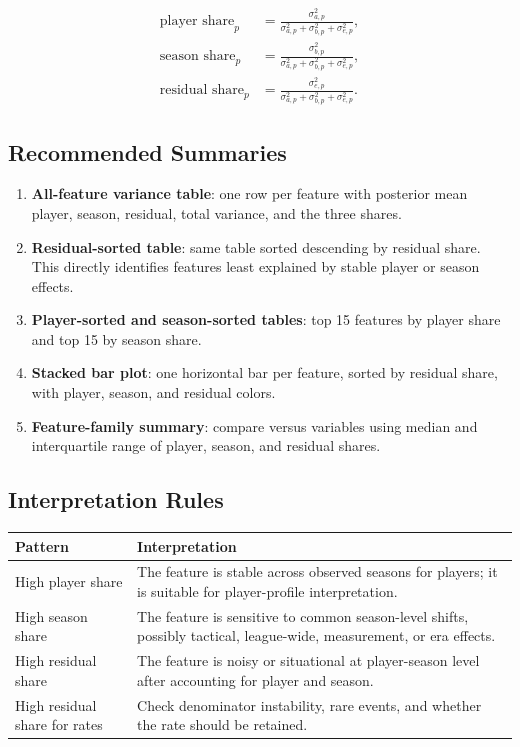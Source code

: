 \documentclass[11pt]{article}
\newcommand{\code}[1]{\texttt{\detokenize{#1}}}
\begin{document}
\begin{align*}
\text{player share}_p &=
\frac{\sigma^2_{a,p}}{\sigma^2_{a,p} + \sigma^2_{b,p} + \sigma^2_{e,p}}, \\
\text{season share}_p &=
\frac{\sigma^2_{b,p}}{\sigma^2_{a,p} + \sigma^2_{b,p} + \sigma^2_{e,p}}, \\
\text{residual share}_p &=
\frac{\sigma^2_{e,p}}{\sigma^2_{a,p} + \sigma^2_{b,p} + \sigma^2_{e,p}}.
\end{align*}

\subsection{Recommended Summaries}

\begin{enumerate}[leftmargin=*]
  \item \textbf{All-feature variance table}: one row per feature with posterior
  mean player, season, residual, total variance, and the three shares.
  \item \textbf{Residual-sorted table}: same table sorted descending by residual
  share. This directly identifies features least explained by stable player or
  season effects.
  \item \textbf{Player-sorted and season-sorted tables}: top 15 features by
  player share and top 15 by season share.
  \item \textbf{Stacked bar plot}: one horizontal bar per feature, sorted by
  residual share, with player, season, and residual colors.
  \item \textbf{Feature-family summary}: compare \code{per90_*} versus
  \code{rate_*} variables using median and interquartile range of player,
  season, and residual shares.
\end{enumerate}

\subsection{Interpretation Rules}

\begin{longtable}{L{0.30\textwidth}L{0.60\textwidth}}
\toprule
Pattern & Interpretation \\
\midrule
\endhead
High player share & The feature is stable across observed seasons for players;
it is suitable for player-profile interpretation. \\
High season share & The feature is sensitive to common season-level shifts,
possibly tactical, league-wide, measurement, or era effects. \\
High residual share & The feature is noisy or situational at player-season
level after accounting for player and season. \\
High residual share for rates & Check denominator instability, rare events,
and whether the rate should be retained. \\
\bottomrule
\end{longtable}
\end{document}
